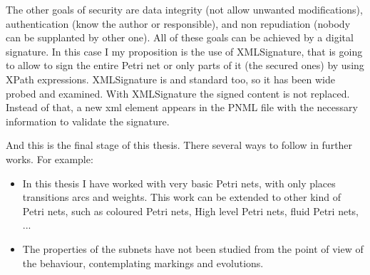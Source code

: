 The other goals of security are data integrity (not allow unwanted modifications), authentication (know the author or responsible), and non repudiation (nobody
can be supplanted by other one). All of these goals can be achieved by a digital
signature. In this case I my proposition is the use of XMLSignature, that is going to
allow to sign the entire Petri net or only parts of it (the secured ones)
by using XPath expressions. XMLSignature is and standard too, so it has been
wide probed and examined. With XMLSignature the signed content is not replaced.
Instead of that, a new xml element appears in the PNML file with the necessary
information to validate the signature. 

And this is the final stage of this thesis. There several ways to follow in further works. For example:

\begin{itemize}
\item In this thesis I have worked with very basic Petri nets, with only
places transitions arcs and weights. This work can be extended to other kind
of Petri nets, such as coloured Petri nets, High level Petri nets, fluid
Petri nets, ...
\item The properties of the subnets have not been studied from the point of view
of the behaviour, contemplating markings and evolutions.  
\end{itemize} 
